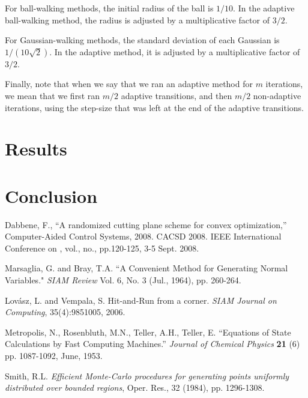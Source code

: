 \documentclass[11pt]{article}
\begin{document}
For ball-walking methods, the initial radius of the ball is $1/10$. In the adaptive ball-walking method, the radius is adjusted by a multiplicative factor of $3/2$.

For Gaussian-walking methods, the standard deviation of each Gaussian is $1/(10\sqrt{2})$. In the adaptive method, it is adjusted by a multiplicative factor of $3/2$.

Finally, note that when we say that we ran an adaptive method for $m$ iterations, we mean that we first ran $m/2$ adaptive transitions, and then $m/2$ non-adaptive iterations, using the step-size that was left at the end of the adaptive transitions.

\section{Results}

\section{Conclusion}

\pagebreak

\begin{thebibliography}{99}

 Dabbene, F., ``A randomized cutting plane scheme for convex optimization,'' Computer-Aided Control Systems, 2008. CACSD 2008. IEEE International Conference on , vol., no., pp.120-125, 3-5 Sept. 2008.

 Marsaglia, G. and Bray, T.A. ``A Convenient Method for Generating Normal Variables." \emph{SIAM Review} Vol. 6, No. 3 (Jul., 1964), pp. 260-264.

 Lov\'asz, L. and Vempala, S. Hit-and-Run from a corner. \emph{SIAM Journal on Computing}, 35(4):9851005, 2006.

 Metropolis, N., Rosenbluth, M.N., Teller, A.H., Teller, E. ``Equations of State Calculations by Fast Computing Machines.'' \emph{Journal of Chemical Physics} \textbf{21} (6) pp. 1087-1092, June, 1953.

 Smith, R.L. \emph{Efficient Monte-Carlo procedures for generating points uniformly distributed over
bounded regions}, Oper. Res., 32 (1984), pp. 1296-1308.

\end{thebibliography}
\end{document}
